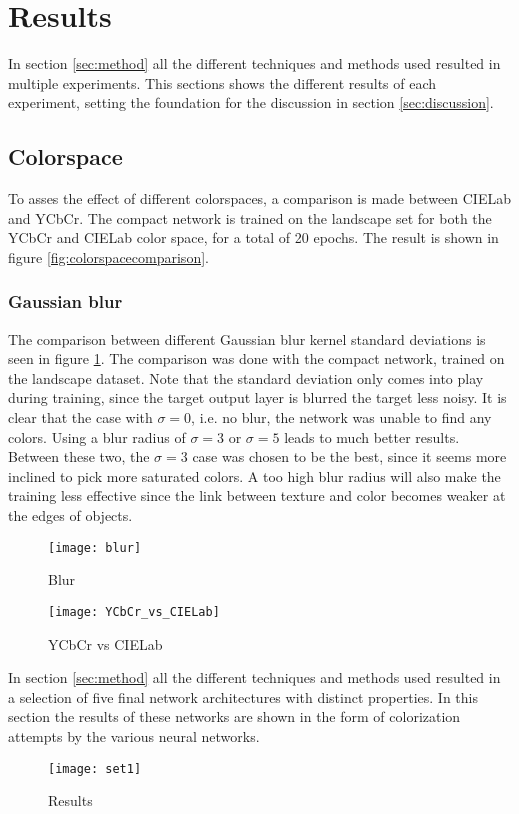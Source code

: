 \section{Results}\label{sec:results}

In section \ref{sec:method} all the different techniques and methods used resulted in multiple experiments. This sections shows the different results of each experiment, setting the foundation for the discussion in section \ref{sec:discussion}.

\subsection{Colorspace}
To asses the effect of different colorspaces, a comparison is made between CIELab and YCbCr. The compact network is trained on the landscape set for both the YCbCr and CIELab color space, for a total of 20 epochs. The result is shown in figure \ref{fig:colorspacecomparison}.

\subsubsection{Gaussian blur}
The comparison between different Gaussian blur kernel standard deviations is seen in figure \ref{fig:blur}. The comparison was done with the compact network, trained on the landscape dataset. Note that the standard deviation only comes into play during training, since the target output layer is blurred the target less noisy. It is clear that the case with $\sigma=0$, i.e. no blur, the network was unable to find any colors. Using a blur radius of $\sigma=3$ or $\sigma=5$ leads to much better results. Between these two, the $\sigma=3$ case was chosen to be the best, since it seems more inclined to pick more saturated colors. A too high blur radius will also make the training less effective since the link between texture and color becomes weaker at the edges of objects.

\begin{figure}[h]
	\centering
	\texttt{[image: blur]}
	\caption{Blur}
	\label{fig:blur}
\end{figure}

\begin{figure}[h]
	\centering
	\texttt{[image: YCbCr\_vs\_CIELab]}
	\caption{YCbCr vs CIELab}
	\label{fig:YCbCr_vs_CIELab}
\end{figure}

In section \ref{sec:method} all the different techniques and methods used resulted in a selection of five final network architectures with distinct properties. In this section the results of these networks are shown in the form of colorization attempts by the various neural networks.

\begin{figure}[h]
	\centering
	\texttt{[image: set1]}
	\caption{Results}
	\label{fig:results}
\end{figure}


